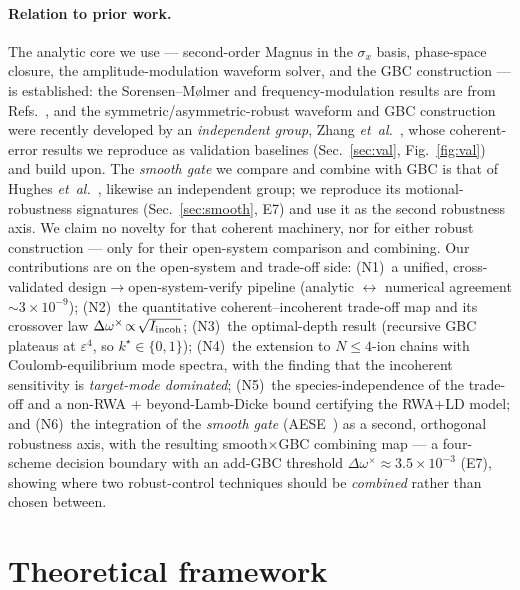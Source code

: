 \documentclass[aps,prapplied,twocolumn,superscriptaddress,floatfix,nofootinbib]{revtex4-2}
\begin{document}
\paragraph*{Relation to prior work.} The analytic core we use --- second-order Magnus in
the $\sigma_x$ basis, phase-space closure, the amplitude-modulation waveform solver, and
the GBC construction --- is established: the Sorensen--M\o lmer and frequency-modulation
results are from Refs.~\cite{Sorensen00,Leung18}, and the symmetric/asymmetric-robust
waveform and GBC construction were recently developed by an \emph{independent group},
Zhang \emph{et~al.}~\cite{Zhang25}, whose coherent-error results we reproduce as validation
baselines (Sec.~\ref{sec:val}, Fig.~\ref{fig:val}) and build upon. The \emph{smooth gate} we compare
and combine with GBC is that of Hughes \emph{et~al.}~\cite{Hughes25}, likewise an independent group;
we reproduce its motional-robustness signatures (Sec.~\ref{sec:smooth}, E7) and use it as
the second robustness axis. We claim no novelty for that coherent machinery, nor for either robust
construction --- only for their open-system comparison and combining. Our contributions are on the
open-system and trade-off side:
(N1)~a unified, cross-validated design$\to$open-system-verify pipeline (analytic
$\leftrightarrow$ numerical agreement $\sim\!3\times10^{-9}$); (N2)~the quantitative
coherent--incoherent trade-off map and its crossover law
$\Delta\omega^\times\!\propto\!\sqrt{I_{\rm incoh}}$; (N3)~the optimal-depth result
(recursive GBC plateaus at $\varepsilon^4$, so $k^\star\!\in\!\{0,1\}$); (N4)~the extension
to $N\!\le\!4$-ion chains with Coulomb-equilibrium mode spectra, with the finding that the
incoherent sensitivity is \emph{target-mode dominated}; (N5)~the species-independence of
the trade-off and a non-RWA + beyond-Lamb-Dicke bound certifying the RWA+LD model; and
(N6)~the integration of the \emph{smooth gate} (AESE~\cite{Hughes25}) as a second, orthogonal
robustness axis, with the resulting smooth$\times$GBC combining map --- a four-scheme decision
boundary with an add-GBC threshold $\Delta\omega^\times\!\approx\!3.5\times10^{-3}$ (E7),
showing where two robust-control techniques should be \emph{combined} rather than chosen between.

\section{Theoretical framework}
\end{document}
